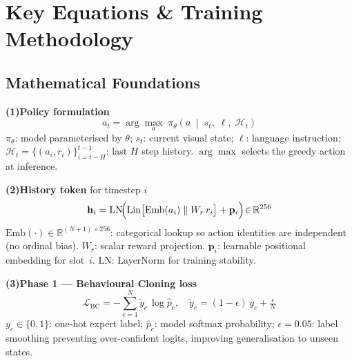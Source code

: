 \documentclass[11pt, a4paper]{article}
\begin{document}
\newpage
\section{Key Equations \& Training Methodology}

\subsection*{Mathematical Foundations}

\begin{eqnbox}
\small
\noindent
\begin{minipage}[t]{0.46\linewidth}

\textbf{(1)\;Policy formulation}
\begin{equation*}
  a_t = \arg\max_{a}\;\pi_\theta\!\left(
      a \;\middle|\; s_t,\;\ell,\;\mathcal{H}_t
  \right)
\end{equation*}
$\pi_\theta$: model parameterised by $\theta$;
$s_t$: current visual state;
$\ell$: language instruction;
$\mathcal{H}_t{=}\{(a_i,r_i)\}_{i=t-H}^{t-1}$: last $H$ step history.
$\arg\max$ selects the greedy action at inference.

\medskip
\textbf{(2)\;History token} for timestep $i$
\begin{equation*}
  \mathbf{h}_i = \mathrm{LN}\!\Bigl(
    \mathrm{Lin}\bigl[\mathrm{Emb}(a_i) \parallel W_r\,r_i\bigr]
    + \mathbf{p}_i
  \Bigr) \!\in\! \mathbb{R}^{256}
\end{equation*}
$\mathrm{Emb}(\cdot)\!\in\!\mathbb{R}^{(N+1)\times256}$: categorical lookup
so action identities are independent (no ordinal bias).
$W_r$: scalar reward projection.
$\mathbf{p}_i$: learnable positional embedding for slot~$i$.
$\mathrm{LN}$: LayerNorm for training stability.

\end{minipage}%
\hfill
\begin{minipage}[t]{0.49\linewidth}

\textbf{(3)\;Phase 1 --- Behavioural Cloning loss}
\begin{equation*}
  \mathcal{L}_{\mathrm{BC}} = -\sum_{c=1}^{N}
    \tilde{y}_c \,\log \hat{p}_c,
  \quad
  \tilde{y}_c = (1{-}\epsilon)\,y_c + \tfrac{\epsilon}{N}
\end{equation*}
$y_c\in\{0,1\}$: one-hot expert label;
$\hat{p}_c$: model softmax probability;
$\epsilon{=}0.05$: label smoothing preventing over-confident logits,
improving generalisation to unseen states.


\end{minipage}
\end{eqnbox}
\end{document}
